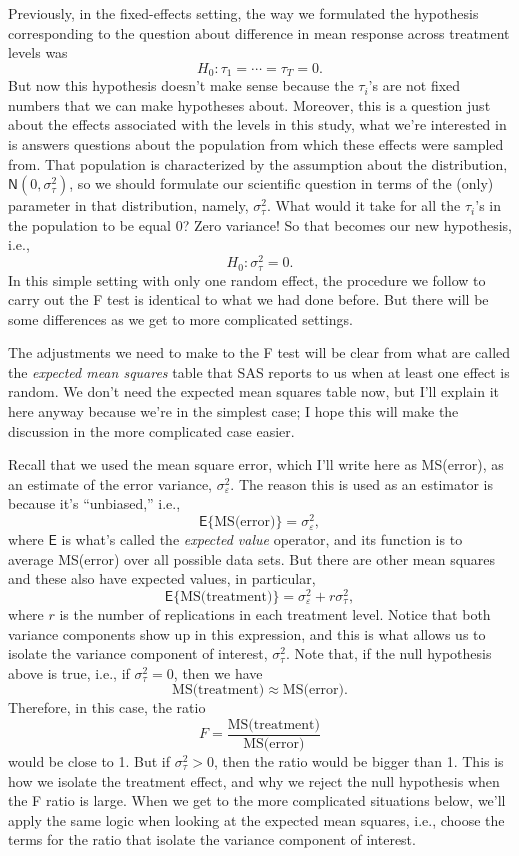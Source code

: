 \documentclass[a4paper, 12pt]{article}
\theoremstyle{plain}
\theoremstyle{definition}
\theoremstyle{remark}
\newcommand{\E}{\mathsf{E}}
\newcommand{\eps}{\varepsilon}
\newcommand{\nm}{\mathsf{N}}
\begin{document}
Previously, in the fixed-effects setting, the way we formulated the hypothesis corresponding to the question about difference in mean response across treatment levels was 
\[ H_0: \tau_1 = \cdots = \tau_T = 0. \]
But now this hypothesis doesn't make sense because the $\tau_i$'s are not fixed numbers that we can make hypotheses about.  Moreover, this is a question just about the effects associated with the levels in this study, what we're interested in is answers questions about the population from which these effects were sampled from.  That population is characterized by the assumption about the distribution, $\nm(0, \sigma_\tau^2)$, so we should formulate our scientific question in terms of the (only) parameter in that distribution, namely, $\sigma_\tau^2$.  What would it take for all the $\tau_i$'s in the population to be equal 0?  Zero variance!  So that becomes our new hypothesis, i.e., 
\[ H_0: \sigma_\tau^2 = 0. \]
In this simple setting with only one random effect, the procedure we follow to carry out the F test is identical to what we had done before.  But there will be some differences as we get to more complicated settings.  

The adjustments we need to make to the F test will be clear from what are called the {\em expected mean squares} table that SAS reports to us when at least one effect is random.  We don't need the expected mean squares table now, but I'll explain it here anyway because we're in the simplest case; I hope this will make the discussion in the more complicated case easier.  

Recall that we used the mean square error, which I'll write here as MS(error), as an estimate of the error variance, $\sigma_\eps^2$.  The reason this is used as an estimator is because it's ``unbiased,'' i.e., 
\[ \E\{\text{MS(error)}\} = \sigma_\eps^2, \]
where $\E$ is what's called the {\em expected value} operator, and its function is to average MS(error) over all possible data sets.  But there are other mean squares and these also have expected values, in particular, 
\[ \E\{\text{MS(treatment)}\} = \sigma_\eps^2 + r \sigma_\tau^2, \]
where $r$ is the number of replications in each treatment level.  Notice that both variance components show up in this expression, and this is what allows us to isolate the variance component of interest, $\sigma_\tau^2$.  Note that, if the null hypothesis above is true, i.e., if $\sigma_\tau^2=0$, then we have 
\[ \text{MS(treatment)} \approx \text{MS(error)}. \]
Therefore, in this case, the ratio 
\[ F = \frac{\text{MS(treatment)}}{\text{MS(error)}} \]
would be close to 1.  But if $\sigma_\tau^2 > 0$, then the ratio would be bigger than 1.  This is how we isolate the treatment effect, and why we reject the null hypothesis when the F ratio is large.  When we get to the more complicated situations below, we'll apply the same logic when looking at the expected mean squares, i.e., choose the terms for the ratio that isolate the variance component of interest.  
\end{document}
